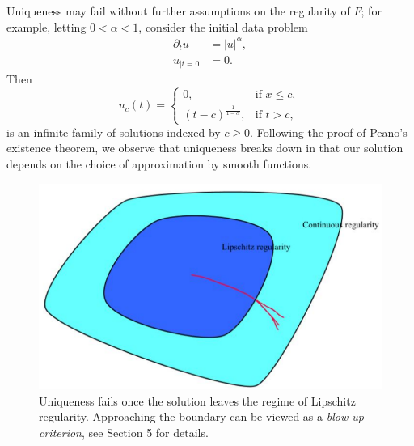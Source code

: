 \begin{remark}
	Uniqueness may fail without further assumptions on the regularity of $F$; for example, letting $0 < \alpha < 1$, consider the initial data problem
			\begin{align*}
				\partial_t u 	&= |u|^\alpha, \\
				u_{|t = 0}		&= 0.
			\end{align*}
	Then 
		\[
			u_c (t) = 
				\begin{cases}
					0, 												&\text{if } x \leq c, \\
					(t - c)^\frac{1}{1 - \alpha}, 	&\text{if } t > c,
				\end{cases}
		\]		
	is an infinite family of solutions indexed by $c \geq 0$. Following the proof of Peano's existence theorem, we observe that uniqueness breaks down in that our solution depends on the choice of approximation by smooth functions. 
	
	\begin{figure}[h]
	\begin{center}
		\includegraphics[scale = 0.5]{unique}
		\caption{Uniqueness fails once the solution leaves the regime of Lipschitz regularity. Approaching the boundary can be viewed as a \textit{blow-up criterion}, see Section 5 for details. }
	\end{center}
\end{figure}
\end{remark}